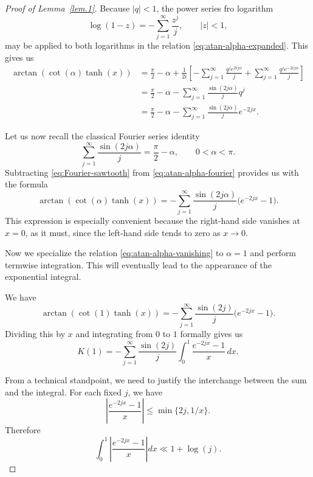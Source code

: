 \documentclass[preprint,12pt,nopreprintline]{elsarticle}
\begin{document}
\begin{proof}[Proof of Lemma~\ref{lem.1}]
Because $|q|<1$, the power series fro logarithm
\[
\log(1-z)=-\sum_{j=1}^{\infty}\frac{z^j}{j},
\qquad |z|<1,
\]
may be applied to both logarithms in the relation \eqref{eq:atan-alpha-expanded}. This gives us
\begin{align}
\arctan\left(\cot\left(\alpha\right)\tanh \left(x\right)\right)
&=
\frac{\pi}{2}-\alpha
+
\frac{1}{2i}
\left[
-\sum_{j=1}^{\infty}\frac{q^j e^{2ij\alpha}}{j}
+
\sum_{j=1}^{\infty}\frac{q^j e^{-2ij\alpha}}{j}
\right]
\nonumber\\
&=
\frac{\pi}{2}-\alpha
-
\sum_{j=1}^{\infty}\frac{\sin(2j\alpha)}{j}q^j
\nonumber\\
&=
\frac{\pi}{2}-\alpha
-
\sum_{j=1}^{\infty}\frac{\sin(2j\alpha)}{j}e^{-2jx}.
\label{eq:atan-alpha-fourier}
\end{align}

Let us now recall the classical Fourier series identity
\begin{equation}\label{eq:Fourier-sawtooth}
\sum_{j=1}^{\infty}\frac{\sin(2j\alpha)}{j}
=
\frac{\pi}{2}-\alpha,
\qquad 0<\alpha<\pi.
\end{equation}
Subtracting \eqref{eq:Fourier-sawtooth} from \eqref{eq:atan-alpha-fourier} provides us with the formula
\begin{equation}\label{eq:atan-alpha-vanishing}
\arctan\left(\cot\left(\alpha\right)\tanh \left(x\right)\right)
=
-\sum_{j=1}^{\infty}\frac{\sin(2j\alpha)}{j}\bigl(e^{-2jx}-1\bigr).
\end{equation}
This expression is especially convenient because the right-hand side vanishes at $x=0$, as it must, since the left-hand side tends to zero as $x\longrightarrow 0$.

\vspace{0.2cm}
Now we specialize the relation \eqref{eq:atan-alpha-vanishing} to $\alpha=1$ and perform termwise integration. This will eventually lead to the appearance of the exponential integral.

We have
\[
\arctan\left(\cot \left(1\right)\tanh \left(x\right)\right)
=
-\sum_{j=1}^{\infty}\frac{\sin(2j)}{j}\bigl(e^{-2jx}-1\bigr).
\]
Dividing this by $x$ and integrating from $0$ to $1$ formally gives us
\begin{equation}\label{eq:K1-formal}
K(1)
=
-\sum_{j=1}^{\infty}\frac{\sin(2j)}{j}
\int_0^1 \frac{e^{-2jx}-1}{x}\,dx.
\end{equation}

From a technical standpoint, we need to justify the interchange between the sum and the integral. For each fixed $j$, we have
\[
\left|\frac{e^{-2jx}-1}{x}\right|
\le
\min\{2j,1/x\}.
\]
Therefore
\[
\int_0^1 \left|\frac{e^{-2jx}-1}{x}\right|dx
\ll 1+\log \left(j\right).
\]


\end{proof}
\end{document}
